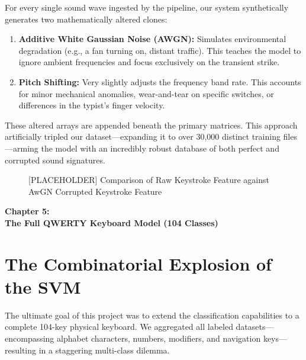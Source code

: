 \documentclass[12pt,a4paper]{article}
\begin{document}
For every single sound wave ingested by the pipeline, our system synthetically generates two mathematically altered clones:
\begin{enumerate}
    \item \textbf{Additive White Gaussian Noise (AWGN):} Simulates environmental degradation (e.g., a fan turning on, distant traffic). This teaches the model to ignore ambient frequencies and focus exclusively on the transient strike.
    \item \textbf{Pitch Shifting:} Very slightly adjusts the frequency band rate. This accounts for minor mechanical anomalies, wear-and-tear on specific switches, or differences in the typist's finger velocity.
\end{enumerate}

These altered arrays are appended beneath the primary matrices. This approach artificially tripled our dataset—expanding it to over 30,000 distinct training files—arming the model with an incredibly robust database of both perfect and corrupted sound signatures.

\begin{figure}[H]
\centering
    \vspace{4cm}
    \caption{[PLACEHOLDER] Comparison of Raw Keystroke Feature against AwGN Corrupted Keystroke Feature}
\end{figure}

\clearpage
\thispagestyle{empty}

\vspace*{\fill}
\begin{center}
    {\Huge\textbf{Chapter 5:}}\\[1em]
    {\Large\textbf{The Full QWERTY Keyboard Model (104 Classes)}}
\end{center}
\vspace*{\fill}

\clearpage
\setcounter{chapter}{5}

\section{The Combinatorial Explosion of the SVM}
The ultimate goal of this project was to extend the classification capabilities to a complete 104-key physical keyboard. We aggregated all labeled datasets—encompassing alphabet characters, numbers, modifiers, and navigation keys—resulting in a staggering multi-class dilemma. 
\end{document}
